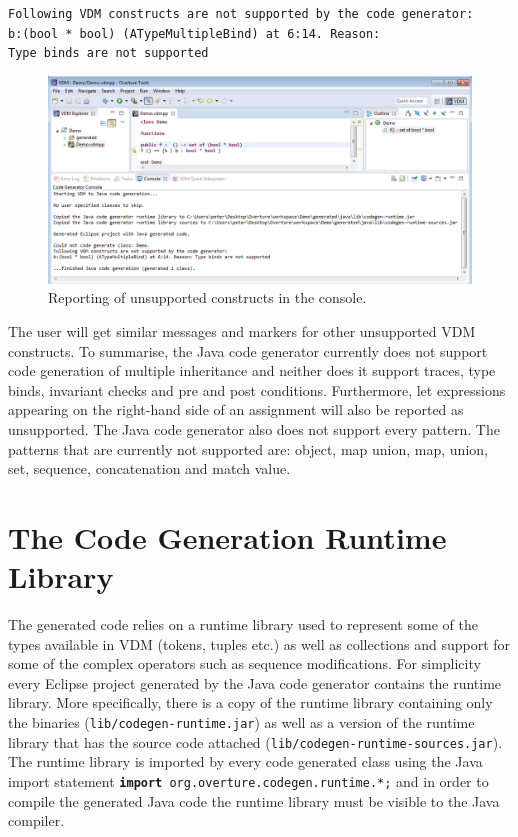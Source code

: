 \noindent \texttt{Following VDM constructs are not supported by the
  code generator:\\ b:(bool * bool) (ATypeMultipleBind) at
  6:14. Reason:\\ Type binds are not supported}\\

\begin{figure}[htbp]
\begin{center}
\includegraphics[width=\linewidth]{screenDumps/javacg_unsupported}
\caption{Reporting of unsupported constructs in the
console.\label{fig:javacg_unsupported}}
\end{center}
\end{figure}

The user will get similar messages and markers for other unsupported
VDM constructs. To summarise, the Java code generator currently does
not support code generation of multiple inheritance and neither does
it support traces, type binds, invariant checks and pre and post
conditions. Furthermore, let expressions appearing on the right-hand
side of an assignment will also be reported as unsupported. The Java
code generator also does not support every pattern. The patterns that
are currently not supported are: object, map union, map, union, set,
sequence, concatenation and match value.

\section{The Code Generation Runtime Library}

The generated code relies on a runtime library used to represent some
of the types available in VDM (tokens, tuples etc.) as well as
collections and support for some of the complex operators such as
sequence modifications. For simplicity every Eclipse project generated
by the Java code generator contains the runtime library. More
specifically, there is a copy of the runtime library containing only
the binaries (\texttt{lib/codegen-runtime.jar}) as well as a version
of the runtime library that has the source code attached
(\texttt{lib/codegen-runtime-sources.jar}). The runtime library is
imported by every code generated class using the Java import statement
\texttt{\textbf{import} org.overture.codegen.runtime.*;} and in order
to compile the generated Java code the runtime library must be visible
to the Java compiler.

